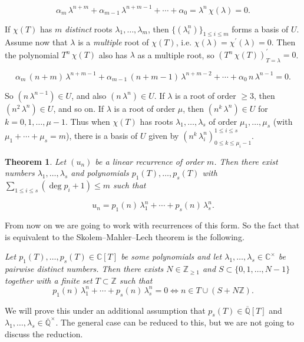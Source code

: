 \documentclass{article}
\newcommand{\ZZ}{\mathbb{Z}}
\newcommand{\QQ}{\mathbb{Q}}
\theoremstyle{myplain}
\newtheorem{theorem}[proposition]{Theorem}
\theoremstyle{mydefinition}
\begin{document}
\[ \alpha_m \, \lambda^{n+m} + \alpha_{m-1}\,\lambda^{n+m-1} + \cdots + \alpha_0 =
  \lambda^n \, \chi (\lambda) = 0. \]

If $\chi (T)$ has $m$ \emph{distinct} roots $\lambda_1, \ldots, \lambda_m$, then
$\{(\lambda_{i}^{n})\}_{1\leq i\leq m}$ forms a basis of $U$. Assume now that
$\lambda$ is a \emph{multiple} root of $\chi (T)$, i.e.
$\chi (\lambda) = \chi^\prime (\lambda) = 0$. Then the polynomial
$T^n \, \chi (T)$ also has $\lambda$ as a multiple root, so
$(T^n \, \chi (T))^\prime_{T = \lambda} = 0$.

\[ \alpha_m \, (n+m) \, \lambda^{n+m-1} + \alpha_{m-1}\,(n+m-1)\,\lambda^{n+m-2} + \cdots + \alpha_0\,n\,\lambda^{n-1} = 0. \]

So $(n\,\lambda^{n-1}) \in U$, and also $(n\,\lambda^n) \in U$. If $\lambda$ is
a root of order $\ge 3$, then $(n^2\,\lambda^n) \in U$, and so on. If $\lambda$
is a root of order $\mu$, then $(n^k\,\lambda^n) \in U$ for
$k = 0, 1, \ldots, \mu-1$. Thus when $\chi (T)$ has roots
$\lambda_1, \ldots, \lambda_s$ of order $\mu_1, \ldots, \mu_s$ (with
$\mu_1 + \cdots + \mu_s = m$), there is a basis of $U$ given by
$(n^k \, \lambda_i^n)_{0 \le k \le \mu_i - 1}^{1 \le i \le s}$.

\begin{theorem}
  Let $(u_n)$ be a linear recurrence of order $m$. Then there exist numbers
  $\lambda_1, \ldots, \lambda_s$ and polynomials $p_1 (T), \ldots, p_s (T)$ with
  $\sum_{1 \le i \le s} (\deg p_i + 1) \le m$ such that

  \[ u_n = p_1 (n) \, \lambda_1^n + \cdots + p_s (n) \, \lambda_s^n. \]
\end{theorem}

From now on we are going to work with recurrences of this form. So the fact that
is equivalent to the Skolem--Mahler--Lech theorem is the following.

\emph{Let $p_1 (T), \ldots, p_s (T) \in \mathbb{C} [T]$ be some polynomials and
  let $\lambda_1, \ldots, \lambda_s \in \mathbb{C}^\times$ be pairwise distinct
  numbers. Then there exists $N \in \ZZ_{\ge 1}$ and
  $S \subset \{ 0, 1, \ldots, N-1 \}$ together with a finite set $T \subset \ZZ$
  such that}
\[ p_1 (n) \, \lambda_1^n + \cdots + p_s (n) \, \lambda_s^n = 0 \iff n \in T \cup (S + N\ZZ). \]

We will prove this under an additional assumption that
$p_s (T) \in \overline{\QQ} [T]$ and
$\lambda_1, \ldots, \lambda_s \in \overline{\QQ}^\times$. The general case can
be reduced to this, but we are not going to discuss the reduction.
\end{document}
